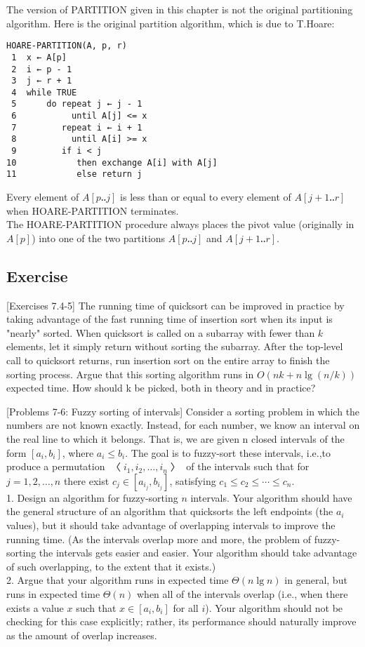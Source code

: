 \documentclass{article}
\begin{document}
The version of PARTITION given in this chapter is not the original partitioning algorithm. Here is the original partition algorithm, which is due to T.Hoare:
\begin{verbatim}
HOARE-PARTITION(A, p, r)
 1  x ← A[p]
 2  i ← p - 1
 3  j ← r + 1
 4  while TRUE
 5      do repeat j ← j - 1
 6           until A[j] <= x
 7         repeat i ← i + 1
 8           until A[i] >= x
 9         if i < j
10            then exchange A[i] with A[j]
11            else return j
\end{verbatim}
Every element of $A[p ‥ j]$ is less than or equal to every element of $A[j +1 ‥ r]$ when HOARE-PARTITION terminates.\\
The HOARE-PARTITION procedure always places the pivot value (originally in $A[p]$) into one of the two partitions $A[p ‥ j]$ and $A[j + 1 ‥ r]$.

\subsection{Exercise}
[Exercises 7.4-5]
The running time of quicksort can be improved in practice by taking advantage of the fast running time of insertion sort when its input is "nearly" sorted.
When quicksort is called on a subarray with fewer than $k$ elements, let it simply return without sorting the subarray.
After the top-level call to quicksort returns, run insertion sort on the entire array to finish the sorting process.
Argue that this sorting algorithm runs in $O(nk + n \lg(n/k))$ expected time. How should k be picked, both in theory and in practice?

[Problems 7-6: Fuzzy sorting of intervals]
Consider a sorting problem in which the numbers are not known exactly. Instead, for each number, we know an interval on the real line to which it belongs.
That is, we are given n closed intervals of the form $[a_i, b_i]$, where $a_i \leq b_i$.
The goal is to fuzzy-sort these intervals, i.e.,to produce a permutation $〈i_1, i_2,\ldots, i_n〉$ of the intervals such that for $j = 1,2,\ldots,n$
there exist $c_j \in [a_{i_j}, b_{i_j}]$, satisfying $c_1 \leq c_2 \leq \cdots \leq c_n$.\\
1.	Design an algorithm for fuzzy-sorting $n$ intervals. Your algorithm should have the general structure of an algorithm that
quicksorts the left endpoints (the $a_i$ values), but it should take advantage of overlapping intervals to improve the running time.
(As the intervals overlap more and more, the problem of fuzzy-sorting the intervals gets easier and easier.
Your algorithm should take advantage of such overlapping, to the extent that it exists.)\\
2.	Argue that your algorithm runs in expected time $\Theta(n \lg n)$ in general, but runs in expected time $\Theta(n)$
when all of the intervals overlap (i.e., when there exists a value $x$ such that $x \in [a_i, b_i]$ for all $i$).
Your algorithm should not be checking for this case explicitly; rather, its performance should naturally improve as the amount of overlap increases.
\end{document}
